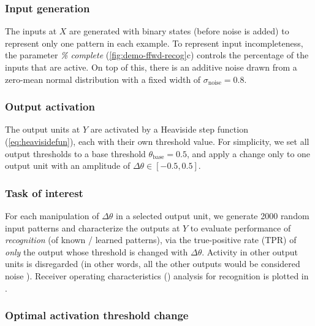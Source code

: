 \subsubsection*{Input generation}

The inputs at $X$ are generated with binary states (before noise is added)
        to represent only one pattern in each example.
    To represent input incompleteness, the parameter \textit{\% complete}
        (\autoref{fig:demo-ffwd-recog}c)
        controls the percentage of the inputs that are active.
    On top of this, there is an additive noise
        drawn from a zero-mean normal distribution
        with a fixed width of $\sigma_{\text{noise}} = 0.8$.

\subsubsection*{Output activation}

The output units at $Y$ are activated by a Heaviside step function (\autoref{eq:heavisidefun}),
    each with their own threshold value.
    For simplicity, we set all output thresholds
        to a base threshold $\theta_{\text{base}} = 0.5$,
        and apply a change only to one output unit with an amplitude of $\Delta \theta \in [-0.5,0.5]$.

\subsubsection*{Task of interest}

For each manipulation of $\Delta \theta$ in a selected output unit,
        we generate 2000 random input patterns
        and characterize the outputs at $Y$ to evaluate performance of \textit{recognition} (of known / learned patterns),
        via the true-positive rate (TPR) of \textit{only} the output whose threshold is changed with $\Delta \theta$.
    Activity in other output units is disregarded
        (in other words, all the other outputs would be considered noise
        ).
    Receiver operating characteristics
        ()
        analysis for recognition is plotted in
        .

\subsubsection*{Optimal activation threshold change}

